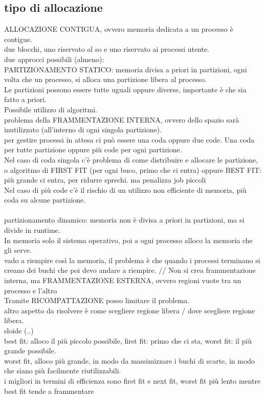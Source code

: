 \documentclass{article}
\begin{document}
\subsection{tipo di allocazione}
ALLOCAZIONE CONTIGUA, ovvero memoria dedicata a un processo è contigue.\\
due blocchi, uno riservato al so e uno riservato ai processi utente. \\
due approcci possibili (almeno):\\
PARTIZIONAMENTO STATICO: memoria divisa a priori in partizioni, ogni volta che un processo, si alloca una partizione libera al processo.\\
Le partizioni possono essere tutte uguali oppure diverse, importante è che sia fatto a priori.\\
Possibile utilizzo di algoritmi.\\
problema della FRAMMENTAZIONE INTERNA, ovvero dello spazio sarà inutilizzato (all'interno di ogni singola partizione).\\
per gestire processi in attesa ci può essere una coda oppure due code. Una coda per tutte partizione oppure più code per ogni partizione.\\
Nel caso di coda singola c'è problema di come distribuire e allocare le partizione, o algoritmo di FIRST FIT (per ogni buco, primo che ci entra) oppure BEST FIT: più grande ci entra, per ridurre sprechi. ma penalizza job piccoli \\
Nel caso di più code c'è il rischio di un utilizzo non efficiente di memoria, più coda su alcune partizione.
\paragraph{}{partizionamento dinamico:} memoria non è divisa a priori in partizioni, ma si divide in runtime.\\ 
In memoria solo il sistema operativo, poi a ogni processo alloco la memoria che gli serve.\\
vado a riempire così la memoria, il problema è che quando i processi terminano si creano dei buchi che poi devo andare a riempire. //
Non si crea frammentazione interna, ma FRAMMENTAZIONE ESTERNA, ovvero regioni vuote tra un processo e l'altro\\
Tramite RICOMPATTAZIONE posso limitare il problema.\\
altro aspetto da risolvere è come scegliere regione libera / dove scegliere regione libera.\\
sloide (..)\\
best fit: alloco il più piccolo possibile, first fit: primo che ci sta, worst fit: il più grande possibile.\\
worst fit, alloco più grande, in modo da massimizzare i buchi di scarte, in modo che siano più facilmente riutilizzabili.\\
i migliori in termini di efficienza sono first fit e next fit, worst fit più lento mentre best fit tende a frammentare\\
\end{document}
